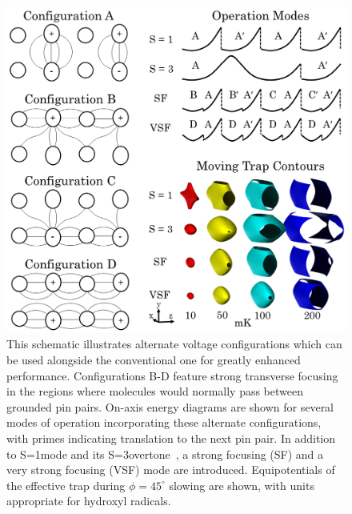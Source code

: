 \documentclass[%
 reprint,
 amsmath,amssymb,
 aps,
prl,
]{revtex4-1}
\newcommand{\s}{{\nobreak\hspace{.2em}}}
\newcommand{\SO}{{S=1}}
\newcommand{\ST}{{S=3}}
\begin{document}
\begin{figure}[ht!]
\includegraphics[width=\linewidth]{chargecartoon.png}%
\caption{
This schematic illustrates alternate voltage configurations which can be used alongside the conventional one for greatly enhanced performance. Configurations B-D feature strong transverse focusing in the regions where molecules would normally pass between grounded pin pairs. On-axis energy diagrams are shown for several modes of operation incorporating these alternate configurations, with primes indicating translation to the next pin pair. In addition to \SO\s mode and its \ST\s overtone~\cite{VanDeMeerakker2005a}, a strong focusing (SF) and a very strong focusing (VSF) mode are introduced. Equipotentials of the effective trap during $\phi=45^\circ$ slowing are shown, with units appropriate for hydroxyl radicals.
}
\label{fig:chargecartoon}
\end{figure}
\end{document}
